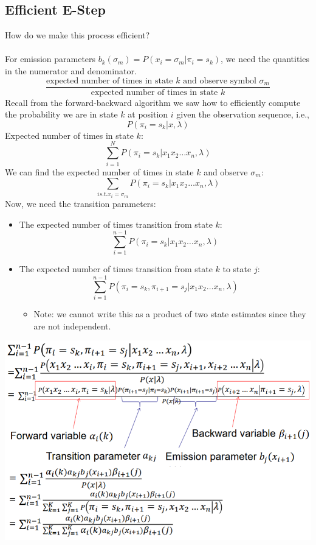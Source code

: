 \documentclass[10pt]{article}
\begin{document}
\subsection*{Efficient E-Step}
How do we make this process efficient?\\\\
For emission parameters $b_k (\sigma_m) = P(x_i = \sigma_m | \pi_i = s_k)$, we need the quantities in the numerator and denominator.
\[\frac{\text{expected number of times in state $k$ and observe symbol $\sigma_m$}}{\text{expected number of times in state $k$}}\]
Recall from the forward-backward algorithm we saw how to efficiently compute the probability we are in state $k$ at position $i$ given the observation sequence, i.e.,
\[P(\pi_i = s_k | x, \lambda)\]
Expected number of times in state $k$:
\[\sum_{i = 1}^N P(\pi_i = s_k | x_1 x_2 \dots x_n, \lambda)\]
We can find the expected number of times in state $k$ and observe $\sigma_m$:
\[\sum_{i s.t. x_i = \sigma_m} P(\pi_i = s_k | x_1 x_2 \dots x_n, \lambda)\]
Now, we need the transition parameters:
\begin{itemize}
	\item The expected number of times transition from state $k$:
	\[\sum_{i = 1}^{n - 1} P(\pi_i = s_k | x_1 x_2 \dots x_n, \lambda)\]
    \item The expected number of times transition from state $k$ to state $j$:
    \[\sum_{i = 1}^{n - 1} P(\pi_i = s_k, \pi_{i + 1} = s_j | x_1 x_2 \dots x_n, \lambda)\]
    \begin{itemize}
        \item Note: we cannot write this as a product of two state estimates since they are not independent.
    \end{itemize}
\end{itemize}
\begin{center} 
	\includegraphics*[width=\textwidth]{W9_34.png} 
\end{center}
\end{document}
